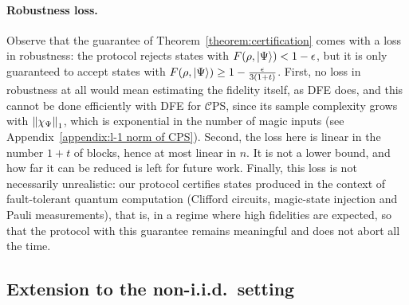 \documentclass[a4paper,twocolumn,11pt,unpublished]{../../revision/quantumarticle}
\newcommand{\CEPS}{$\mathcal C$PS}
\providecommand{\DIFadd}[1]{{\protect\color{blue} \sf #1}} %
\providecommand{\DIFaddend}{} %
\begin{document}
        \paragraph{\DIFadd{Robustness loss.}}
        \DIFadd{Observe that the guarantee of Theorem~\ref{theorem:certification} comes with a loss in robustness: the protocol rejects states with $F(\rho,\ket\Psi)<1-\epsilon$, but it is only guaranteed to accept states with $F(\rho,\ket\Psi)\ge1-\frac{\epsilon}{3(1+t)}$. First, no loss in robustness at all would mean estimating the fidelity itself, as DFE does, and this cannot be done efficiently with DFE for \CEPS, since its sample complexity grows with $\left\lVert\chi_\Psi\right\rVert_1$, which is exponential in the number of magic inputs (see Appendix~\ref{appendix:l-1 norm of CPS}). Second, the loss here is linear in the number $1+t$ of blocks, hence at most linear in $n$. It is not a lower bound, and how far it can be reduced is left for future work. Finally, this loss is not necessarily unrealistic: our protocol certifies states produced in the context of fault-tolerant quantum computation (Clifford circuits, magic-state injection and Pauli measurements), that is, in a regime where high fidelities are expected, so that the protocol with this guarantee remains meaningful and does not abort all the time.
}


\DIFaddend \subsection{Extension to the non-i.i.d.\ setting}
\end{document}
